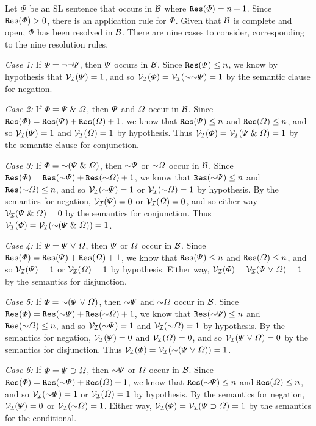 Let $\varPhi$ be an SL sentence that occurs in $\mathcal{B}$ where $\texttt{Res}(\varPhi)=n+1$.
Since $\texttt{Res}(\varPhi)>0$, there is an application rule for $\varPhi$. 
Given that $\mathcal{B}$ is complete and open, $\varPhi$ has been resolved in $\mathcal{B}$. 
There are nine cases to consider, corresponding to the nine resolution rules.


\textit{Case 1:} 
If $\varPhi=\neg\neg\varPsi$, then $\varPsi$ occurs in $\mathcal{B}$.
Since $\texttt{Res}(\varPsi)\leq n$, we know by hypothesis that $\mathcal{V}_{\mathcal{I}}(\varPsi)=1$, and so $\V{\I}(\metaA)=\V{\I}(\enot\enot\metaB)=1$ by the semantic clause for negation. 

\textit{Case 2:} 
If $\varPhi=\varPsi\mathrel\&\varOmega$, then $\varPsi$ and $\varOmega$ occur in $\mathcal{B}$.
Since $\texttt{Res}(\varPhi) = \texttt{Res}(\varPsi) + \texttt{Res}(\varOmega) + 1$, we know that $\texttt{Res}(\varPsi)\leq n$ and $\texttt{Res}(\varOmega)\leq n$, and so $\mathcal{V}_{\mathcal{I}}(\varPsi)=1$ and $\mathcal{V}_{\mathcal{I}}(\varOmega)=1$ by hypothesis.  
Thus $\mathcal{V}_{\mathcal{I}}(\varPhi)=\mathcal{V}_{\mathcal{I}}(\varPsi\mathrel\&\varOmega)=1$ by the semantic clause for conjunction.

\textit{Case 3:} 
If $\metaA=\enot(\metaB\eand\metaC)$, then $\enot\metaB$ or $\enot\metaC$ occur in $\mathcal{B}$.
Since $\res(\metaA) = \res(\enot\metaB) + \res(\enot\metaC) + 1$, we know that $\res(\enot\metaB)\leq n$ and $\res(\enot\metaC)\leq n$, and so $\V{\I}(\enot\metaB)=1$ or $\V{\I}(\enot\metaC)=1$ by hypothesis.  
By the semantics for negation, $\mathcal{V}_{\mathcal{I}}(\varPsi)=0$ or $\mathcal{V}_{\mathcal{I}}(\varOmega)=0$, and so either way $\mathcal{V}_{\mathcal{I}}(\varPsi\mathrel\&\varOmega)=0$ by the semantics for conjunction.
Thus $\V{\I}(\metaA)=\V{\I}(\enot(\metaB\eand\metaC))=1$.

\textit{Case 4:} 
If $\varPhi=\varPsi\mkern1mu\vee\mkern1mu\varOmega$, then $\varPsi$ or $\varOmega$ occur in $\mathcal{B}$.
Since $\texttt{Res}(\varPhi) = \texttt{Res}(\varPsi) + \texttt{Res}(\varOmega) + 1$, we know that $\texttt{Res}(\varPsi)\leq n$ and $\texttt{Res}(\varOmega)\leq n$, and so $\mathcal{V}_{\mathcal{I}}(\varPsi)=1$ or $\mathcal{V}_{\mathcal{I}}(\varOmega)=1$ by hypothesis.  
Either way, $\mathcal{V}_{\mathcal{I}}(\varPhi)=\mathcal{V}_{\mathcal{I}}(\varPsi\mkern1mu\vee\mkern1mu\varOmega)=1$ by the semantics for disjunction.

\textit{Case 5:} 
If $\metaA=\enot(\metaB\eor\metaC)$, then $\enot\metaB$ and $\enot\metaC$ occur in $\mathcal{B}$.
Since $\res(\metaA) = \res(\enot\metaB) + \res(\enot\metaC) + 1$, we know that $\res(\enot\metaB)\leq n$ and $\res(\enot\metaC)\leq n$, and so $\V{\I}(\enot\metaB)=1$ and $\V{\I}(\enot\metaC)=1$ by hypothesis.  
By the semantics for negation, $\mathcal{V}_{\mathcal{I}}(\varPsi)=0$ and $\mathcal{V}_{\mathcal{I}}(\varOmega)=0$, and so $\mathcal{V}_{\mathcal{I}}(\varPsi\mkern1mu\vee\mkern1mu\varOmega)=0$ by the semantics for disjunction.
Thus $\V{\I}(\metaA)=\V{\I}(\enot(\metaB\eor\metaC))=1$.

\textit{Case 6:} 
If $\varPhi=\varPsi\supset\varOmega$, then $\enot\metaB$ or $\varOmega$ occur in $\mathcal{B}$.
Since $\res(\metaA) = \res(\enot\metaB) + \res(\metaC) + 1$, we know that $\res(\enot\metaB)\leq n$ and $\texttt{Res}(\varOmega)\leq n$, and so $\V{\I}(\enot\metaB)=1$ or $\mathcal{V}_{\mathcal{I}}(\varOmega)=1$ by hypothesis.  
By the semantics for negation, $\mathcal{V}_{\mathcal{I}}(\varPsi)=0$ or $\V{\I}(\enot\metaC)=1$.
Either way, $\mathcal{V}_{\mathcal{I}}(\varPhi)=\mathcal{V}_{\mathcal{I}}(\varPsi\supset\varOmega)=1$ by the semantics for the conditional.

